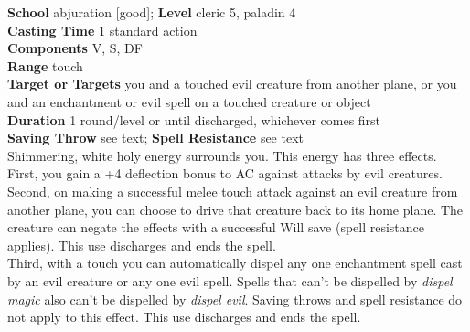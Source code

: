 \textbf{School} abjuration [good]; \textbf{Level} cleric 5, paladin 4\\
\textbf{Casting Time} 1 standard action\\
\textbf{Components} V, S, DF\\
\textbf{Range} touch\\
\textbf{Target or Targets} you and a touched evil creature from another plane, or you and an enchantment or evil spell on a touched creature or object\\
\textbf{Duration} 1 round/level or until discharged, whichever comes first \\
\textbf{Saving Throw} see text; \textbf{Spell Resistance} see text\\
Shimmering, white holy energy surrounds you. This energy has three effects.\\
First, you gain a +4 deflection bonus to AC against attacks by evil creatures.\\
Second, on making a successful melee touch attack against an evil creature from another plane, you can choose to drive that creature back to its home plane. The creature can negate the effects with a successful Will save (spell resistance applies). This use discharges and ends the spell.\\
Third, with a touch you can automatically dispel any one enchantment spell cast by an evil creature or any one evil spell. Spells that can't be dispelled by \textit{dispel magic }also can't be dispelled by \textit{dispel evil}. Saving throws and spell resistance do not apply to this effect. This use discharges and ends the spell.\\
